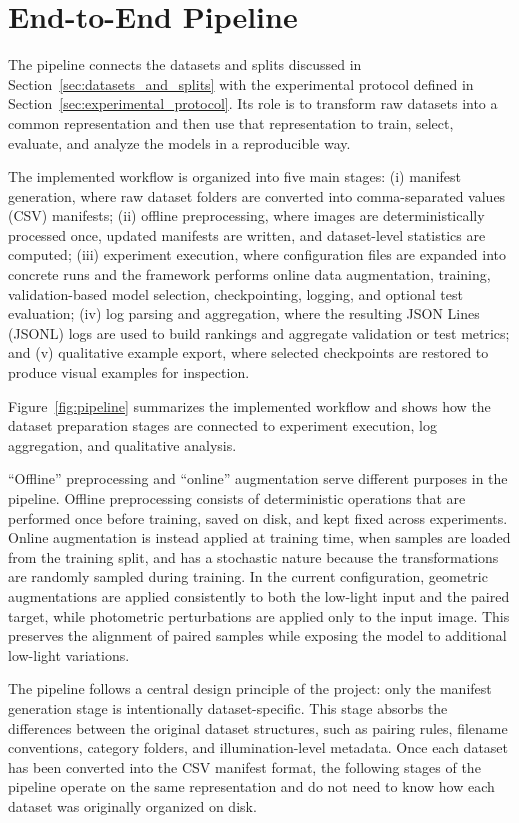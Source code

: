 \section{End-to-End Pipeline}

The pipeline connects the datasets and splits discussed in Section~\ref{sec:datasets_and_splits} with the experimental protocol defined in Section~\ref{sec:experimental_protocol}. Its role is to transform raw datasets into a common representation and then use that representation to train, select, evaluate, and analyze the models in a reproducible way.

The implemented workflow is organized into five main stages: (i) manifest generation, where raw dataset folders are converted into comma-separated values (CSV) manifests; (ii) offline preprocessing, where images are deterministically processed once, updated manifests are written, and dataset-level statistics are computed; (iii) experiment execution, where configuration files are expanded into concrete runs and the framework performs online data augmentation, training, validation-based model selection, checkpointing, logging, and optional test evaluation; (iv) log parsing and aggregation, where the resulting JSON Lines (JSONL) logs are used to build rankings and aggregate validation or test metrics; and (v) qualitative example export, where selected checkpoints are restored to produce visual examples for inspection.

Figure~\ref{fig:pipeline} summarizes the implemented workflow and shows how the dataset preparation stages are connected to experiment execution, log aggregation, and qualitative analysis.



``Offline'' preprocessing and ``online'' augmentation serve different purposes in the pipeline. Offline preprocessing consists of deterministic operations that are performed once before training, saved on disk, and kept fixed across experiments. Online augmentation is instead applied at training time, when samples are loaded from the training split, and has a stochastic nature because the transformations are randomly sampled during training. In the current configuration, geometric augmentations are applied consistently to both the low-light input and the paired target, while photometric perturbations are applied only to the input image. This preserves the alignment of paired samples while exposing the model to additional low-light variations.

The pipeline follows a central design principle of the project: only the manifest generation stage is intentionally dataset-specific. This stage absorbs the differences between the original dataset structures, such as pairing rules, filename conventions, category folders, and illumination-level metadata. Once each dataset has been converted into the CSV manifest format, the following stages of the pipeline operate on the same representation and do not need to know how each dataset was originally organized on disk.

